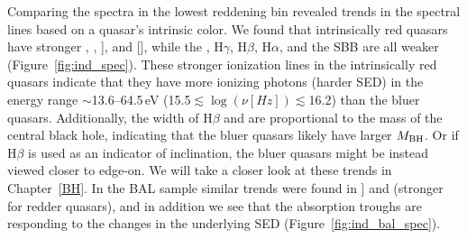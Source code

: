 Comparing the spectra in the lowest reddening bin revealed trends in the spectral lines based on a quasar's intrinsic color.  We found that intrinsically red quasars have stronger , , ], and [], while the , H$\gamma$, H$\beta$, H$\alpha$, and the SBB are all weaker (Figure~\ref{fig:ind_spec}).  
These stronger ionization lines in the intrinsically red quasars indicate that they have more ionizing photons (harder SED) in the energy range $\sim$13.6--64.5\,eV (15.5$\lesssim\log{(\nu [Hz])}\lesssim$16.2) than the bluer quasars. Additionally, the width of H$\beta$ and  are proportional to the mass of the central black hole, indicating that the bluer quasars likely have larger $M_{\rm BH}$.  Or if H$\beta$ is used as an indicator of inclination, the bluer quasars might be instead viewed closer to edge-on.
We will take a closer look at these trends in Chapter~\ref{BH}.
In the BAL sample similar trends were found in ] and  (stronger for redder quasars), and in addition we see that the absorption troughs are responding to the changes in the underlying SED (Figure~\ref{fig:ind_bal_spec}).
